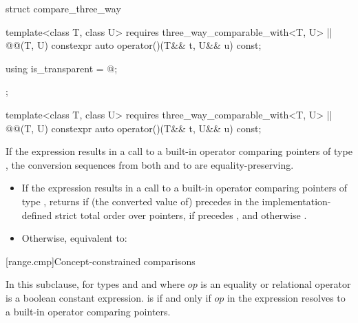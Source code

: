%
\begin{codeblock}
struct compare_three_way {
  template<class T, class U>
    requires three_way_comparable_with<T, U> || @@(T, U)
  constexpr auto operator()(T&& t, U&& u) const;

  using is_transparent = @\unspec@;
};
\end{codeblock}

\begin{itemdecl}
template<class T, class U>
  requires three_way_comparable_with<T, U> || @@(T, U)
constexpr auto operator()(T&& t, U&& u) const;
\end{itemdecl}

\begin{itemdescr}
\pnum
\expects
If the expression  results in
a call to a built-in operator \tcode{<=>} comparing pointers of type ,
the conversion sequences from both  and  to 
are equality-preserving.

\pnum
\effects
\begin{itemize}
\item
  If the expression  results in
  a call to a built-in operator \tcode{<=>} comparing pointers of type ,
  returns 
  if (the converted value of)  precedes 
  in the implementation-defined strict total order
  over pointers,
  if  precedes , and
  otherwise .
\item
  Otherwise, equivalent to: 
\end{itemize}
\end{itemdescr}

[range.cmp]{Concept-constrained comparisons}

\pnum
In this subclause,  for types 
and  and where $op$ is an equality or relational
operator is a boolean constant expression.
 is  if and only if $op$
in the expression  resolves to a built-in
operator comparing pointers.

